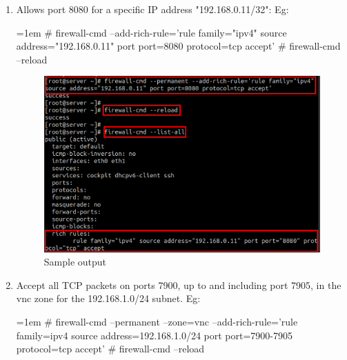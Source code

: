 \begin{flushleft}
\begin{itemize}
\begin{enumerate}
		\newpage
		
		\item Allows port 8080 for a specific IP address "192.168.0.11/32":
		\newline
		Eg:
		\begin{tcolorbox}[breakable,notitle,boxrule=-0pt,colback=black,colframe=black]
			\color{green}
			\font=1em
			\# firewall-cmd --add-rich-rule='rule family="ipv4" source address="192.168.0.11" port port=8080 protocol=tcp accept'
			\newline
			\newline
			\# firewall-cmd --reload
			\font=4pt
		\end{tcolorbox}
		
		\begin{figure}[h!]
			\centering
			\includegraphics[scale=.3]{content/chapter2/images/zones11.png}
			\caption{Sample output}
			\label{fig:command_prompt9}
		\end{figure}
		
		\newpage
		\item Accept all TCP packets on ports 7900, up to and including port 7905, in the vnc zone for the 192.168.1.0/24 subnet.
		\newline
		Eg:
		\begin{tcolorbox}[breakable,notitle,boxrule=-0pt,colback=black,colframe=black]
			\color{green}
			\font=1em
			\# firewall-cmd --permanent --zone=vnc --add-rich-rule='rule family=ipv4 source address=192.168.1.0/24 port port=7900-7905 protocol=tcp accept'
			\newline
			\newline
			\# firewall-cmd --reload
			\font=4pt
		\end{tcolorbox}
		

\end{enumerate}
\end{itemize}
\end{flushleft}
